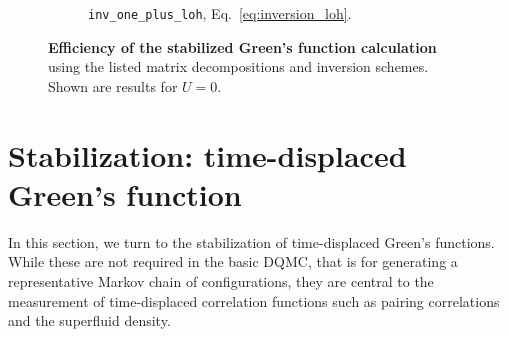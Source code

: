\documentclass[submission, Phys]{SciPost}
\begin{document}
\begin{figure}
\begin{subfigure}{0.48\textwidth}
		\caption{\texttt{inv\_one\_plus\_loh}, Eq.~\eqref{eq:inversion_loh}. \label{fig:greens_benchmark_loh}}
	\end{subfigure}
	\vspace{5pt}
	\caption{\textbf{Efficiency of the stabilized Green's function calculation} using the listed matrix decompositions and inversion schemes. Shown are results for $U=0$.\label{fig:greens_benchmark}}
\end{figure}


\section{Stabilization: time-displaced Green's function}\label{sec:TDGF}

In this section, we turn to the stabilization of time-displaced Green's functions. While these are not required in the basic DQMC, that is for generating a representative Markov chain of configurations, they are central to the measurement of time-displaced correlation functions such as pairing correlations and the superfluid density\cite{Santos2003, Scalapino1993}.
\end{document}
